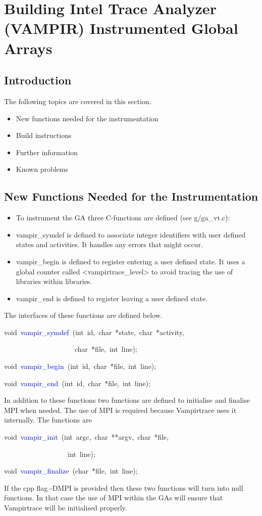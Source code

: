 \section{Building Intel Trace Analyzer (VAMPIR) Instrumented Global Arrays}


\subsection{Introduction}

The following topics are covered in this section.
\begin{itemize}
\item New functions needed for the instrumentation 
\item Build instructions 
\item Further information 
\item Known problems
\end{itemize}

\subsection{New Functions Needed for the Instrumentation}
\begin{itemize}
\item To instrument the GA three C-functions are defined (see g/ga\_vt.c): 
\item vampir\_symdef is defined to associate integer identifiers with user
defined states and activities. It handles any errors that might occur. 
\item vampir\_begin is defined to register entering a user defined state.
It uses a global counter called <vampirtrace\_level> to avoid tracing
the use of libraries within libraries. 
\item vampir\_end is defined to register leaving a user defined state.
\end{itemize}
The interfaces of these functions are defined below.
\begin{lyxcode}
void~\textcolor{blue}{vampir\_symdef}~(int~id,~char~{*}state,~char~{*}activity,~

~~~~~~~~~~~~~~~~~~~~char~{*}file,~int~line);~

void~\textcolor{blue}{vampir\_begin}~(int~id,~char~{*}file,~int~line);~

void~\textcolor{blue}{vampir\_end}~(int~id,~char~{*}file,~int~line);
\end{lyxcode}
In addition to these functions two functions are defined to initialise
and finalise MPI when needed. The use of MPI is required because Vampirtrace
uses it internally. The functions are
\begin{lyxcode}
void~\textcolor{blue}{vampir\_init}~(int~argc,~char~{*}{*}argv,~char~{*}file,~

~~~~~~~~~~~~~~~~~~int~line);~

void~\textcolor{blue}{vampir\_finalize}~(char~{*}file,~int~line);
\end{lyxcode}
If the cpp flag -DMPI is provided then these two functions will turn
into null functions. In that case the use of MPI within the GAs will
ensure that Vampirtrace will be initialised properly.

